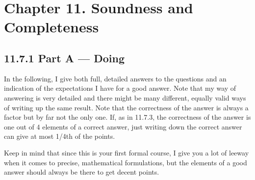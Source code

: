 \chapter{Chapter 11. Soundness and Completeness}

\section*{11.7.1 Part A --- Doing}

In the following, I give both full, detailed answers to the questions
and an indication of the expectations I have for a good answer. Note
that my way of answering is very detailed and there might be many
different, equally valid ways of writing up the same result. Note that
the correctness of the answer is always a factor but by far not the
only one. If, as in 11.7.3, the correctness of the answer is one out
of 4 elements of a correct answer, just writing down the correct
answer can give at most 1/4th of the points.

Keep in mind that since this is your first formal course, I give you a
lot of leeway when it comes to precise, mathematical formulations, but
the elements of a good answer should always be there to get decent
points.

